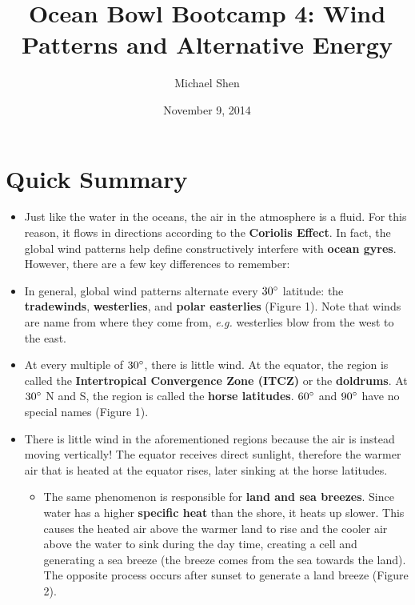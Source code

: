 \documentclass{article}
\begin{document}
\title{Ocean Bowl Bootcamp 4: Wind Patterns and Alternative Energy}
\author{Michael Shen}
\date{November 9, 2014}
\maketitle

\section{Quick Summary}

\begin{itemize}
	\item Just like the water in the oceans, the air in the atmosphere is a fluid. For this reason, it flows in directions according to the \textbf{Coriolis Effect}. In fact, the global wind patterns help define constructively interfere with \textbf{ocean gyres}. However, there are a few key differences to remember:
	
	\item In general, global wind patterns alternate every $30\degree$ latitude: the \textbf{tradewinds}, \textbf{westerlies}, and \textbf{polar easterlies} (Figure 1). Note that winds are name from where they come from, \textit{e.g.} westerlies blow from the west to the east.
	
	\item At every multiple of $30\degree$, there is little wind. At the equator, the region is called the \textbf{Intertropical Convergence Zone (ITCZ)} or the \textbf{doldrums}. At $30\degree$ N and S, the region is called the \textbf{horse latitudes}. $60\degree$ and $90\degree$ have no special names (Figure 1).
	
	\item There is little wind in the aforementioned regions because the air is instead moving vertically! The equator receives direct sunlight, therefore the warmer air that is heated at the equator rises, later sinking at the horse latitudes.
	\begin{itemize}
		\item The same phenomenon is responsible for \textbf{land and sea breezes}. Since water has a higher \textbf{specific heat} than the shore, it heats up slower. This causes the heated air above the warmer land to rise and the cooler air above the water to sink during the day time, creating a cell and generating a sea breeze (the breeze comes from the sea towards the land). The opposite process occurs after sunset to generate a land breeze (Figure 2).
	\end{itemize}
	

\end{itemize}
\end{document}
